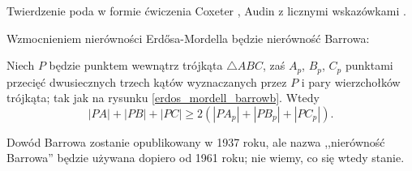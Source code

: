 Twierdzenie poda w formie ćwiczenia Coxeter \cite[s. 9]{coxeter_1991}, Audin z licznymi wskazówkami \cite[s. 102]{audin_2003}.

Wzmocnieniem nierówności Erdősa-Mordella będzie nierówność Barrowa:


\begin{theorem}
    Niech $P$ będzie punktem wewnątrz trójkąta $\triangle ABC$, zaś $A_p$, $B_p$, $C_p$ punktami przecięć dwusiecznych trzech kątów wyznaczanych przez $P$ i pary wierzchołków trójkąta; tak jak na rysunku \ref{erdos_mordell_barrowb}.
    Wtedy
    \begin{equation}
        |PA| + |PB| + |PC| \ge 2 (|PA_p| + |PB_p| + |PC_p|).
    \end{equation}
\end{theorem}

Dowód Barrowa zostanie opublikowany w 1937 roku, ale nazwa ,,nierówność Barrowa'' będzie używana dopiero od 1961 roku; nie wiemy, co się wtedy stanie.

%